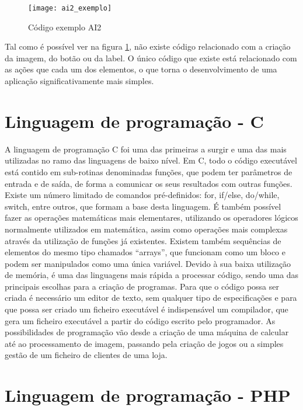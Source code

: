 \begin{figure}[hbtp]
	\centering
	\texttt{[image: ai2\_exemplo]}
	\caption[Código exemplo AI2]{Código exemplo AI2}
	\label{fig:AI2}
\end{figure}

Tal como é possível ver na figura \ref{fig:AI2}, não existe código relacionado com a criação da imagem, do botão ou da label.
O único código que existe está relacionado com as ações que cada um dos elementos, o que torna o desenvolvimento de uma aplicação significativamente mais simples.

\section{Linguagem de programação - C}
\label{sec:C}

A linguagem de programação C foi uma das primeiras a surgir e uma das mais utilizadas no ramo das linguagens de baixo nível.
Em C, todo o código executável está contido em sub-rotinas denominadas funções, que podem ter parâmetros de entrada e de saída, de forma a comunicar os seus resultados com outras funções.
Existe um número limitado de comandos pré-definidos: for, if/else, do/while, switch, entre outros, que formam a base desta linguagem.
É também possível fazer as operações matemáticas mais elementares, utilizando os operadores lógicos normalmente utilizados em matemática, assim como operações mais complexas através da utilização de funções já existentes.
Existem também sequências de elementos do mesmo tipo chamados ``arrays'', que funcionam como um bloco e podem ser manipulados como uma única variável.
Devido à sua baixa utilização de memória, é uma das linguagens mais rápida a processar código, sendo uma das principais escolhas para a criação de programas.
Para que o código possa ser criada é necessário um editor de texto, sem qualquer tipo de especificações e para que possa ser criado um ficheiro executável é indispensável um compilador, que gera um ficheiro executável a partir do código escrito pelo programador.
As possibilidades de programação vão desde a criação de uma máquina de calcular até ao processamento de imagem, passando pela criação de jogos ou a simples gestão de um ficheiro de clientes de uma loja.

\section{Linguagem de programação - PHP}
\label{sec:php}

